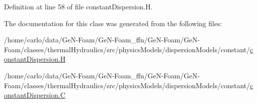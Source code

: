Definition at line 58 of file constant\+Dispersion.\+H.



The documentation for this class was generated from the following files\+:\begin{DoxyCompactItemize}
\item 
/home/carlo/data/\+Ge\+N-\/\+Foam/\+Ge\+N-\/\+Foam\+\_\+ffn/\+Ge\+N-\/\+Foam/\+Ge\+N-\/\+Foam/classes/thermal\+Hydraulics/src/physics\+Models/dispersion\+Models/constant/\hyperlink{constantDispersion_8H}{constant\+Dispersion.\+H}\item 
/home/carlo/data/\+Ge\+N-\/\+Foam/\+Ge\+N-\/\+Foam\+\_\+ffn/\+Ge\+N-\/\+Foam/\+Ge\+N-\/\+Foam/classes/thermal\+Hydraulics/src/physics\+Models/dispersion\+Models/constant/\hyperlink{constantDispersion_8C}{constant\+Dispersion.\+C}\end{DoxyCompactItemize}
